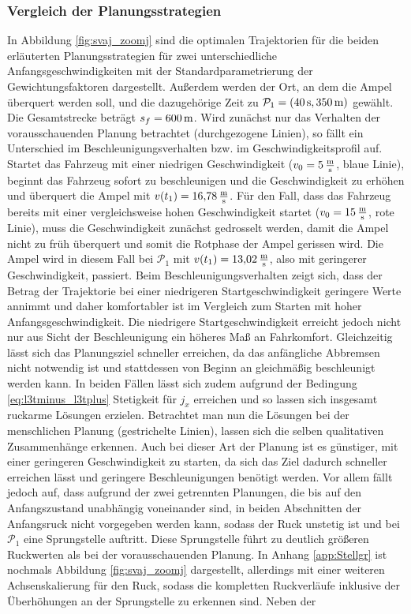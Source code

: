 \subsubsection{Vergleich der Planungsstrategien}\label{subsubsec:Vergleich}
In Abbildung \ref{fig:svaj_zoomj} sind die optimalen Trajektorien für die beiden erläuterten Planungsstrategien für zwei unterschiedliche Anfangsgeschwindigkeiten mit der Standardparametrierung der Gewichtungsfaktoren dargestellt. Außerdem werden der Ort, an dem die Ampel überquert werden soll, und die dazugehörige Zeit zu $\mathcal{P}_1 = (40\,\mathrm{s}, 350\,\mathrm{m})$ gewählt. Die Gesamtstrecke beträgt $s_f = 600\,\mathrm{m}$. Wird zunächst nur das Verhalten der vorausschauenden Planung betrachtet (durchgezogene Linien), so fällt ein Unterschied im Beschleunigungsverhalten bzw. im Geschwindigkeitsprofil auf. Startet das Fahrzeug mit einer niedrigen Geschwindigkeit ($v_0 = 5\,\mathrm{\frac{\mathrm{m}}{\mathrm{s}}}$, blaue Linie), beginnt das Fahrzeug sofort zu beschleunigen und die Geschwindigkeit zu erhöhen und überquert die Ampel mit $v(t_1) = 16{,}78\,\mathrm{\frac{\mathrm{m}}{\mathrm{s}}}$. Für den Fall, dass das Fahrzeug bereits mit einer vergleichsweise hohen Geschwindigkeit startet ($v_0 = 15\,\mathrm{\frac{\mathrm{m}}{\mathrm{s}}}$, rote Linie), muss die Geschwindigkeit zunächst gedrosselt werden, damit die Ampel nicht zu früh überquert und somit die Rotphase der Ampel gerissen wird. Die Ampel wird in diesem Fall bei $\mathcal{P}_1$ mit $v(t_1) = 13{,}02\,\mathrm{\frac{\mathrm{m}}{\mathrm{s}}}$, also mit geringerer Geschwindigkeit, passiert. Beim Beschleunigungsverhalten zeigt sich, dass der Betrag der Trajektorie bei einer niedrigeren Startgeschwindigkeit geringere Werte annimmt und daher komfortabler ist im Vergleich zum Starten mit hoher Anfangsgeschwindigkeit. Die niedrigere Startgeschwindigkeit erreicht jedoch nicht nur aus Sicht der Beschleunigung ein höheres Maß an Fahrkomfort. Gleichzeitig lässt sich das Planungsziel schneller erreichen, da das anfängliche Abbremsen nicht notwendig ist und stattdessen von Beginn an gleichmäßig beschleunigt werden kann. In beiden Fällen lässt sich zudem aufgrund der Bedingung \eqref{eq:l3tminus_l3tplus} Stetigkeit für $j_x$ erreichen und so lassen sich insgesamt ruckarme Lösungen erzielen. Betrachtet man nun die Lösungen bei der menschlichen Planung (gestrichelte Linien), lassen sich die selben qualitativen Zusammenhänge erkennen. Auch bei dieser Art der Planung ist es günstiger, mit einer geringeren Geschwindigkeit zu starten, da sich das Ziel dadurch schneller erreichen lässt und geringere Beschleunigungen benötigt werden. Vor allem fällt jedoch auf, dass aufgrund der zwei getrennten Planungen, die bis auf den Anfangszustand unabhängig voneinander sind, in beiden Abschnitten der Anfangsruck nicht vorgegeben werden kann, sodass der Ruck unstetig ist und bei $\mathcal{P}_1$ eine Sprungstelle auftritt. Diese Sprungstelle führt zu deutlich größeren Ruckwerten als bei der vorausschauenden Planung. In Anhang \ref{app:Stellgr} ist nochmals Abbildung \ref{fig:svaj_zoomj} dargestellt, allerdings mit einer weiteren Achsenskalierung für den Ruck, sodass die kompletten Ruckverläufe inklusive der Überhöhungen an der Sprungstelle zu erkennen sind. Neben der 